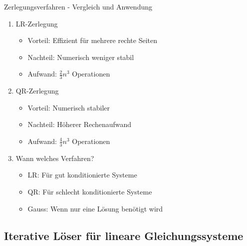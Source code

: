 \begin{KR}{Zerlegungsverfahren - Vergleich und Anwendung}
\begin{enumerate}
    \item LR-Zerlegung
    \begin{itemize}
        \item Vorteil: Effizient für mehrere rechte Seiten
        \item Nachteil: Numerisch weniger stabil
        \item Aufwand: $\frac{2}{3}n^3$ Operationen
    \end{itemize}
    
    \item QR-Zerlegung
    \begin{itemize}
        \item Vorteil: Numerisch stabiler
        \item Nachteil: Höherer Rechenaufwand
        \item Aufwand: $\frac{4}{3}n^3$ Operationen
    \end{itemize}
    
    \item Wann welches Verfahren?
    \begin{itemize}
        \item LR: Für gut konditionierte Systeme
        \item QR: Für schlecht konditionierte Systeme
        \item Gauss: Wenn nur eine Lösung benötigt wird
    \end{itemize}
\end{enumerate}
\end{KR}

\subsection{Iterative Löser für lineare Gleichungssysteme}

